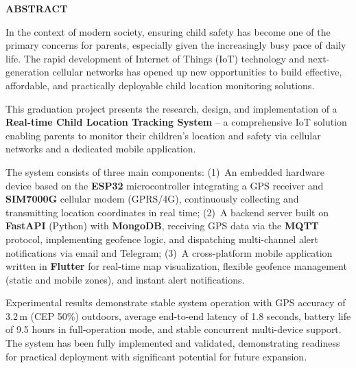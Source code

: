 \documentclass[../DoAn.tex]{subfiles}
\begin{document}
\begin{center}
    \Large{\textbf{ABSTRACT}}\\
\end{center}
\vspace{1cm}
In the context of modern society, ensuring child safety has become one of the primary concerns for parents, especially given the increasingly busy pace of daily life. The rapid development of Internet of Things (IoT) technology and next-generation cellular networks has opened up new opportunities to build effective, affordable, and practically deployable child location monitoring solutions.

This graduation project presents the research, design, and implementation of a \textbf{Real-time Child Location Tracking System} -- a comprehensive IoT solution enabling parents to monitor their children's location and safety via cellular networks and a dedicated mobile application.

The system consists of three main components: (1)~An embedded hardware device based on the \textbf{ESP32} microcontroller integrating a GPS receiver and \textbf{SIM7000G} cellular modem (GPRS/4G), continuously collecting and transmitting location coordinates in real time; (2)~A backend server built on \textbf{FastAPI} (Python) with \textbf{MongoDB}, receiving GPS data via the \textbf{MQTT} protocol, implementing geofence logic, and dispatching multi-channel alert notifications via email and Telegram; (3)~A cross-platform mobile application written in \textbf{Flutter} for real-time map visualization, flexible geofence management (static and mobile zones), and instant alert notifications.

Experimental results demonstrate stable system operation with GPS accuracy of 3.2\,m (CEP 50\%) outdoors, average end-to-end latency of 1.8 seconds, battery life of 9.5 hours in full-operation mode, and stable concurrent multi-device support. The system has been fully implemented and validated, demonstrating readiness for practical deployment with significant potential for future expansion.
\end{document}
